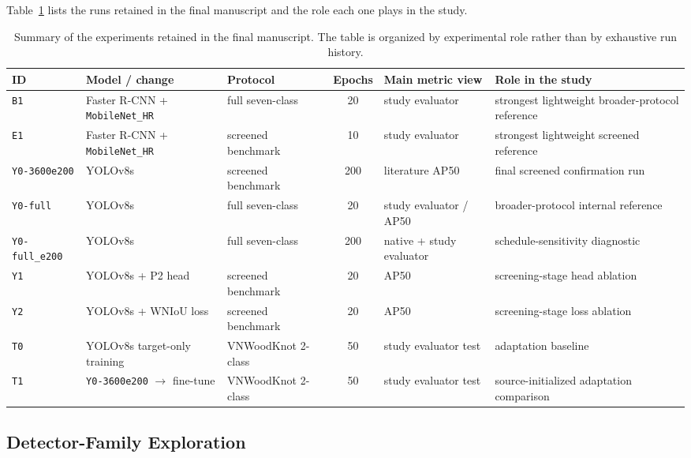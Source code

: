 Table~\ref{tab:experiment-summary} lists the runs retained in the final manuscript and the role each one plays in the study.

\begin{table}[t]
  \centering
  \caption{Summary of the experiments retained in the final manuscript. The table is organized by experimental role rather than by exhaustive run history.}
  \label{tab:experiment-summary}
  \scriptsize
  \setlength{\tabcolsep}{4pt}
  \begin{tabularx}{\textwidth}{>{\raggedright\arraybackslash}p{} >{\raggedright\arraybackslash}p{} >{\raggedright\arraybackslash}p{} c >{\raggedright\arraybackslash}p{} X}
    \toprule
    ID & Model / change & Protocol & Epochs & Main metric view & Role in the study \\
    \midrule
    \texttt{B1} & Faster R-CNN + \texttt{MobileNet\_HR} & full seven-class & 20 & study evaluator & strongest lightweight broader-protocol reference \\
    \texttt{E1} & Faster R-CNN + \texttt{MobileNet\_HR} & screened benchmark & 10 & study evaluator & strongest lightweight screened reference \\
    \texttt{Y0-3600e200} & YOLOv8s & screened benchmark & 200 & literature AP50 & final screened confirmation run \\
    \texttt{Y0-full} & YOLOv8s & full seven-class & 20 & study evaluator / AP50 & broader-protocol internal reference \\
    \texttt{Y0-full\_e200} & YOLOv8s & full seven-class & 200 & native + study evaluator & schedule-sensitivity diagnostic \\
    \texttt{Y1} & YOLOv8s + P2 head & screened benchmark & 20 & AP50 & screening-stage head ablation \\
    \texttt{Y2} & YOLOv8s + WNIoU loss & screened benchmark & 20 & AP50 & screening-stage loss ablation \\
    \texttt{T0} & YOLOv8s target-only training & VNWoodKnot 2-class & 50 & study evaluator test & adaptation baseline \\
    \texttt{T1} & \texttt{Y0-3600e200} $\rightarrow$ fine-tune & VNWoodKnot 2-class & 50 & study evaluator test & source-initialized adaptation comparison \\
    \bottomrule
  \end{tabularx}
\end{table}

\subsection{Detector-Family Exploration}
\label{sec:family-results}

